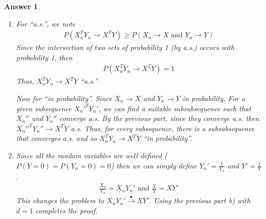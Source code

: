 \documentclass[12pt]{article}
\theoremstyle{colon}
\newtheorem*{answer}{Answer}
\begin{document}
\begin{answer}
\begin{enumerate}[label=\alph*)]
      For ``in probability'', both of the lower bound terms converge to 1 due to convergence ``in probability''. Thus,
      \begin{gather*}
        P( \lvert X_n + Y_n - (X + Y) \rvert < \epsilon) \rightarrow 1
      \end{gather*}
      which gives convergence ``in probability''

      For $L^p$ we have that,
      \begin{gather*}
        \lVert X_n - X \rVert_p \rightarrow 0 \text{ and } \lVert Y_n - Y \rVert_p \rightarrow 0
      \end{gather*}
      Minkowski inequality gives
      \begin{gather*}
        \lVert X_n + Y_n - (X + Y) \rVert_p \leq \lVert X_n - X \rVert_p + \lVert Y_n - Y \rVert_p
      \end{gather*}
      Thus, the right hand side converges to zero and so does the left hand side. This gives us convergence in $L^p$. Note that all the $p$-norms are well defined since $L^p$ is closed under addition and we know all the individual terms are in $L^p$ by assumption.

    \item For ``a.s.'', we note
      \begin{gather*}
        P(X_n^T Y_n \rightarrow X^T Y ) \geq P(X_n \rightarrow X \text{ and } Y_n \rightarrow Y)
      \end{gather*}
      Since the intersection of two sets of probability 1 (by a.s.) occurs with probability 1, then
      \begin{gather*}
        P(X_n^T Y_n \rightarrow X^T Y ) = 1
      \end{gather*}
      Thus, $X_n^T Y_n \rightarrow X^T Y$ ``a.s.''

      Now for ``in probability''. Since $X_n \rightarrow X$ and $Y_n \rightarrow Y$ in probability. For a given subsequence $X_n'^T Y_n'$, we can find a suitable subsubsequence such that $X_n''$ and $Y_n''$ converge a.s. By the previous part, since they converge a.s. then $X_n''^T Y_n'' \rightarrow X^T Y$ a.s. Thus, for every subsequence, there is a subsubsequence that converges a.s. and so $X_n^T Y_n \rightarrow X^T Y$ ``in probability''.

    \item Since all the random variables are well defined ($P(Y = 0) = P(Y_n = 0) = 0$) then we can simply define $Y_n' = \frac{1}{Y_n}$ and $Y' = \frac{1}{Y}$.
      \begin{gather*}
        \frac{X_n}{Y_n} = X_n Y_n' \text{ and } \frac{X}{Y} = X Y'
      \end{gather*}
      This changes the problem to $X_n Y_n' \xrightarrow{\bullet} X Y'$. Using the previous part b) with $d = 1$ completes the proof.


\end{enumerate}
\end{answer}
\end{document}

